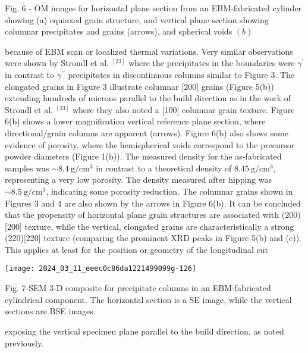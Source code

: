 \documentclass[10pt]{article}
\begin{document}
Fig. 6 - OM images for horizontal plane section from an EBM-fabricated cylinder showing (a) equiaxed grain structure, and vertical plane section showing columnar precipitates and grains (arrows), and spherical voids $(b)$

because of EBM scan or localized thermal variations. Very similar observations were shown by Strondl et al. ${ }^{[23]}$ where the precipitates in the boundaries were $\gamma^{\prime}$ in contrast to $\gamma^{\prime \prime}$ precipitates in discontinuous columns similar to Figure 3. The elongated grains in Figure 3 illustrate columnar [200] grains (Figure 5(b)) extending hundreds of microns parallel to the build direction as in the work of Strondl et al. ${ }^{[23]}$ where they also noted a [100] columnar grain texture. Figure 6(b) shows a lower magnification vertical reference plane section, where directional/grain columns are apparent (arrows). Figure 6(b) also shows some evidence of porosity, where the hemispherical voids correspond to the precursor powder diameters (Figure 1(b)). The measured density for the as-fabricated samples was $\sim 8.4 \mathrm{~g} / \mathrm{cm}^{3}$ in contrast to a theoretical density of $8.45 \mathrm{~g} / \mathrm{cm}^{3}$, representing a very low porosity. The density measured after hipping was $\sim 8.5 \mathrm{~g} / \mathrm{cm}^{3}$, indicating some porosity reduction. The columnar grains shown in Figures 3 and 4 are also shown by the arrows in Figure 6(b). It can be concluded that the propensity of horizontal plane grain structures are associated with (200)[200] texture, while the vertical, elongated grains are characteristically a strong (220)[220] texture (comparing the prominent XRD peaks in Figure 5(b) and (c)). This applies at least for the position or geometry of the longitudinal cut

\begin{center}
\texttt{[image: 2024\_03\_11\_eeec0c86da1221499099g-126]}
\end{center}

Fig. 7-SEM 3-D composite for precipitate columns in an EBM-fabricated cylindrical component. The horizontal section is a SE image, while the vertical sections are BSE images.

exposing the vertical specimen plane parallel to the build direction, as noted previously.
\end{document}
